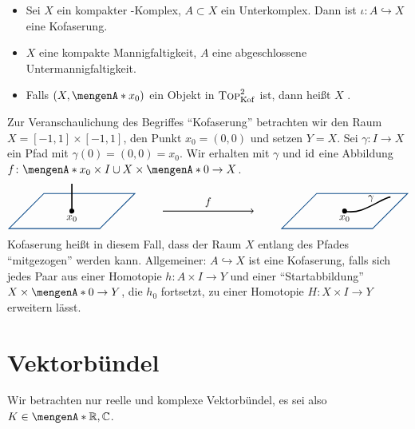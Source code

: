 \begin{beispiel}
\leavevmode
\begin{itemize}
	\item Sei $X$ ein kompakter \CW-Komplex, $A \subset X$ ein Unterkomplex. Dann ist $\iota \colon A \hookrightarrow X$ eine Kofaserung.
	\item $X$ eine kompakte Mannigfaltigkeit, $A$ eine abgeschlossene Untermannigfaltigkeit.
	\item Falls $(X, \set{x_0})$ ein Objekt in $\textsc{Top}^2_{\mathrm{Kof}}$ ist, dann heißt $X$ .
\end{itemize}	
\end{beispiel}

\noindent Zur Veranschaulichung des Begriffes \enquote{Kofaserung} betrachten wir den Raum
$X= [-1,1] \times [-1,1]$, den Punkt $x_0=(0,0)$ und setzen $Y=X$. Sei $\gamma \colon I \to X$ ein Pfad mit $\gamma(0)= (0,0)=x_0$. Wir erhalten mit $\gamma$ und $\operatorname{id}$ eine 
Abbildung $f \colon \set{x_0} \times I \cup  X \times \set{0} \to X$.
\[
	\begin{tikzpicture}[scale=1.5]
		\draw[DodgerBlue4,thick] (1,0,1) -- (1,0,-1) -- (-1,0,-1) -- (-1,0,1) -- cycle;
		\draw[very thick,fill] (0,0,0) circle[radius=0.04] node[below]{$x_0$} -- (0,0.6,0);
		
		\draw[-to,thick] (2,0) -- (4,0) node[midway,above]{$f$};
		
		\draw[DodgerBlue4,thick] (7,0,1) -- (7,0,-1) -- (5,0,-1) -- (5,0,1) -- cycle;
		\draw[very thick] (6,0,0) node[below]{$x_0$} .. controls +(-15:0.4) and +(185:0.2) .. (6.7,0,-0.8) node[midway,above,xshift=0.2]{$\gamma$};
		\filldraw[very thick] (6,0,0) circle[radius=0.04];
	\end{tikzpicture}
\]
Kofaserung heißt in diesem Fall, dass der Raum $X$ entlang des Pfades \enquote{mitgezogen} werden kann. Allgemeiner: $A \hookrightarrow X$ ist eine Kofaserung, falls sich 
jedes Paar aus einer Homotopie $h \colon A \times I \to Y$ und einer \enquote{Startabbildung} $X \times \set{0} \to Y$, die $h_0$ fortsetzt, zu einer Homotopie 
$H \colon X \times I \to Y$ erweitern lässt.
\newpage

\section{Vektorbündel} %
\label{sec:2}
Wir betrachten nur reelle und komplexe Vektorbündel, es sei also $K \in \set{\mathds{R},\mathds{C}}$.

